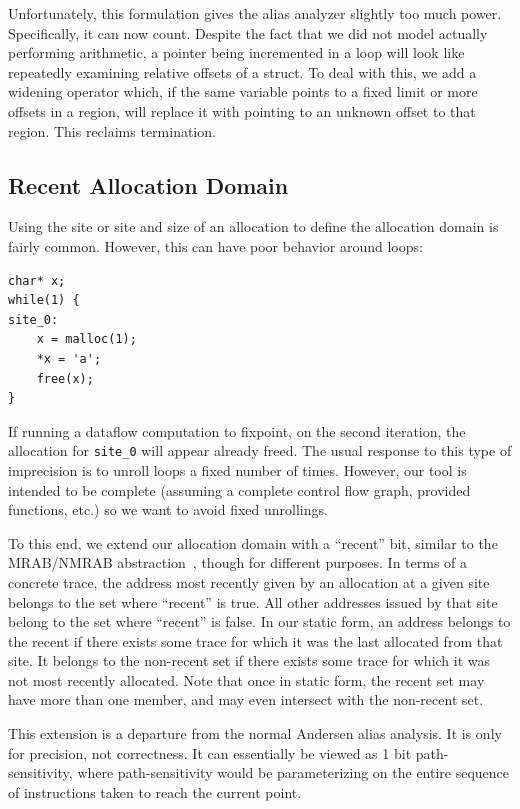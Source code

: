 Unfortunately, this formulation gives the alias analyzer slightly too much power.
Specifically, it can now count.
Despite the fact that we did not model actually performing arithmetic, a pointer being incremented in a loop will look like repeatedly examining relative offsets of a struct.
To deal with this, we add a widening operator which, if the same variable points to a fixed limit or more offsets in a region, will replace it with pointing to an unknown offset to that region.
This reclaims termination.

\subsection{Recent Allocation Domain}
\label{sec:effects}
Using the site or site and size of an allocation to define the allocation domain is fairly common.
However, this can have poor behavior around loops:

\begin{lstlisting}
char* x;
while(1) {
site_0:
	x = malloc(1);
	*x = 'a';
	free(x);
}
\end{lstlisting}

If running a dataflow computation to fixpoint, on the second
iteration, the allocation for \texttt{site\_0} will appear already
freed.  The usual response to this type of imprecision is to unroll
loops a fixed number of times.  However, our tool is intended to be
complete (assuming a complete control flow graph, provided functions,
etc.) so we want to avoid fixed unrollings.

To this end, we extend our allocation domain with a ``recent'' bit,
similar to the MRAB/NMRAB abstraction~\cite{vsa}, though for different
purposes.  In terms of a concrete trace, the address most recently
given by an allocation at a given site belongs to the set where
``recent'' is true.  All other addresses issued by that site belong to
the set where ``recent'' is false.  In our static form, an address
belongs to the recent if there exists some trace for which it was the
last allocated from that site.  It belongs to the non-recent set if
there exists some trace for which it was not most recently allocated.
Note that once in static form, the recent set may have more than one
member, and may even intersect with the non-recent set.

This extension is a departure from the normal Andersen alias analysis.
It is only for precision, not correctness.
It can essentially be viewed as 1 bit path-sensitivity, where path-sensitivity would be parameterizing on the entire sequence of instructions taken to reach the current point.

